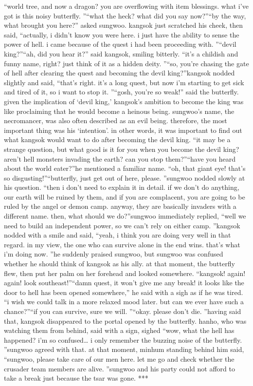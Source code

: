 “world tree, and now a dragon? you are overflowing with item blessings.
 what i’ve got is this noisy butterfly.
”“what the heck? what did you say now?”“by the way, what brought you here?” asked sungwoo.
kangsok just scratched his cheek, then said, “actually, i didn’t know you were here.
 i just have the ability to sense the power of hell.
 i came because of the quest i had been proceeding with.
”“devil king?”“ah, did you hear it?” said kangsok, smiling bitterly.
 “it’s a childish and funny name, right? just think of it as a hidden deity.
”“so, you’re chasing the gate of hell after clearing the quest and becoming the devil king?”kangsok nodded slightly and said, “that’s right.
 it’s a long quest, but now i’m starting to get sick and tired of it, so i want to stop it.
”“gosh, you’re so weak!” said the butterfly.
given the implication of ‘devil king,’ kangsok’s ambition to become the king was like proclaiming that he would become a heinous being.
 sungwoo’s name, the necromancer, was also often described as an evil being.
therefore, the most important thing was his ‘intention’.
 in other words, it was important to find out what kangsok would want to do after becoming the devil king.
“it may be a strange question, but what good is it for you when you become the devil king? aren’t hell monsters invading the earth? can you stop them?”“have you heard about the world eater?”he mentioned a familiar name.
“oh, that giant eye! that’s so disgusting!”“butterfly, just get out of here, please.
”sungwoo nodded slowly at his question.
“then i don’t need to explain it in detail.
 if we don’t do anything, our earth will be ruined by them, and if you are complacent, you are going to be ruled by the angel or demon camp.
 anyway, they are basically invaders with a different name.
 then, what should we do?”sungwoo immediately replied, “well we need to build an independent power, so we can’t rely on either camp.
”kangsok nodded with a smile and said, “yeah, i think you are doing very well in that regard.
 in my view, the one who can survive alone in the end wins.
 that’s what i’m doing now.
”he suddenly praised sungwoo, but sungwoo was confused whether he should think of kangsok as his ally.
at that moment, the butterfly flew, then put her palm on her forehead and looked somewhere.
“kangsok! again! again! look southeast!”“damn quest, it won’t give me any break! it looks like the door to hell has been opened somewhere,” he said with a sigh as if he was tired.
“i wish we could talk in a more relaxed mood later.
 but can we ever have such a chance?”“if you can survive, sure we will.
”“okay.
 please don’t die.
”having said that, kangsok disappeared to the portal opened by the butterfly.
hanho, who was watching them from behind, said with a sign, sighed “wow, what the hell has happened? i’m so confused… i only remember the buzzing noise of the butterfly.
”sungwoo agreed with that.
at that moment, minhum standing behind him said, “sungwoo, please take care of our men here.
 let me go and check whether the crusader team members are alive.
”sungwoo and his party could not afford to take a break just because the tsar was gone.
***

